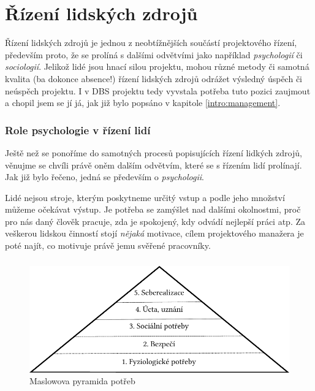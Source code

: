 \chapter{Řízení lidských zdrojů} \label{DBSmanagement}

Řízení lidských zdrojů je jednou z neobtížnějších součástí projektového řízení, především proto, že se prolíná s dalšími odvětvími jako například \emph{psychologií} či \emph{sociologií}. Jelikož lidé jsou hnací silou projektu, mohou různé metody či samotná kvalita (ba dokonce absence!) řízení lidských zdrojů odrážet výsledný úspěch či neúspěch projektu. I v DBS projektu tedy vyvstala potřeba tuto pozici zaujmout a chopil jsem se jí já, jak již bylo popsáno v kapitole \ref{intro:management}.

\subsection{Role psychologie v řízení lidí}
Ještě než se ponoříme do samotných procesů popisujících řízení lidkých zdrojů, věnujme se chvíli právě oněm dalším odvětvím, které se s řízením lidí prolínají. Jak již bylo řečeno, jedná se především o \emph{psychologii}.

Lidé nejsou stroje, kterým poskytneme určitý vstup a podle jeho množství můžeme očekávat výstup. Je potřeba se zamýšlet nad dalšími okolnostmi, proč pro nás daný člověk pracuje, zda je spokojený, kdy odvádí nejlepší práci atp. Za veškerou lidskou činností stojí \emph{nějaká} motivace, cílem projektového manažera je poté najít, co motivuje právě jemu svěřené pracovníky.

\paragraph{}
\begin{figure}[h]
\includegraphics[width=\textwidth]{../pdf/maslow.pdf}
\caption{Maslowova pyramida potřeb} \label{picture:maslow}
\end{figure}

